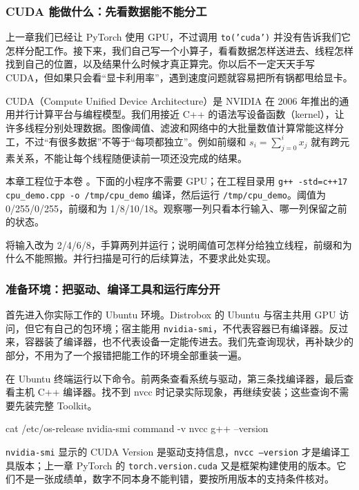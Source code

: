 \newenvironment{cudablock}{\par\noindent\begin{minipage}{\linewidth}}{\end{minipage}\par}

\subsubsection{CUDA 能做什么：先看数据能不能分工}
上一章我们已经让 PyTorch 使用 GPU，不过调用 \texttt{to('cuda')} 并没有告诉我们它怎样分配工作。接下来，我们自己写一个小算子，看看数据怎样送进去、线程怎样找到自己的位置，以及结果什么时候才真正算完。你以后不一定天天手写 CUDA，但如果只会看“显卡利用率”，遇到速度问题就容易把所有锅都甩给显卡。

CUDA（Compute Unified Device Architecture）是 NVIDIA 在 2006 年推出的通用并行计算平台与编程模型。我们用接近 C++ 的语法写设备函数（kernel），让许多线程分别处理数据。图像阈值、滤波和网络中的大批量数值计算常能这样分工，不过“有很多数据”不等于“每项都独立”。例如前缀和 $s_i=\sum_{j=0}^{i}x_j$ 就有跨元素关系，不能让每个线程随便读前一项还没完成的结果。
\begin{example}
本章工程位于本卷 。下面的小程序不需要 GPU；在工程目录用 \texttt{g++ -std=c++17 cpu\_demo.cpp -o /tmp/cpu\_demo} 编译，然后运行 \texttt{/tmp/cpu\_demo}。阈值为 0/255/0/255，前缀和为 1/8/10/18。观察哪一列只看本行输入、哪一列保留之前的状态。
\end{example}
\begin{cudablock}

\end{cudablock}
\begin{exercise}\label{ex:v2-cuda-dependency}
将输入改为 2/4/6/8，手算两列并运行；说明阈值可怎样分给独立线程，前缀和为什么不能照搬。并行扫描是可行的后续算法，不要求此处实现。
\end{exercise}

\subsubsection{准备环境：把驱动、编译工具和运行库分开}
首先进入你实际工作的 Ubuntu 环境。Distrobox 的 Ubuntu 与宿主共用 GPU 访问，但它有自己的包环境；宿主能用 \texttt{nvidia-smi}，不代表容器已有编译器。反过来，容器装了编译器，也不代表设备一定能传进去。我们先查询现状，再补缺少的部分，不用为了一个报错把能工作的环境全部重装一遍。
\begin{example}
在 Ubuntu 终端运行以下命令。前两条查看系统与驱动，第三条找编译器，最后查看主机 C++ 编译器。找不到 nvcc 时记录实际现象，再继续安装；这些查询不需要先装完整 Toolkit。
\begin{tbash}
cat /etc/os-release
nvidia-smi
command -v nvcc
g++ --version
\end{tbash}
\end{example}
\texttt{nvidia-smi} 显示的 CUDA Version 是驱动支持信息，\texttt{nvcc --version} 才是编译工具版本；上一章 PyTorch 的 \texttt{torch.version.cuda} 又是框架构建使用的版本。它们不是一张成绩单，数字不同本身不能判错，要按所用版本的支持条件核对。

